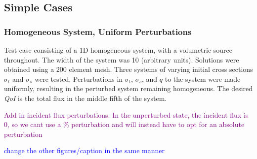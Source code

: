 \documentclass[12pt]{report}
\newcommand{\sigt}{\sigma_t}
\newcommand{\sigs}{\sigma_s}
\newcommand{\scalSource}{q}
\newcommand{\qoi}{{\it QoI}\xspace}
\newcommand{\comment}[2]{\marginpar{\textcolor{#2}{$\star$}}\textcolor{#2}{#1}\newline}
\newcommand{\jcr}[1]{\comment{#1}{blue}}
\newcommand{\todo}[1]{\comment{#1}{purple}}
\newcommand{\jcr}[1]{\phantom{a}}
\newcommand{\todo}[1]{\phantom{a}}
\begin{document}
\subsection{Simple Cases}
\subsubsection{Homogeneous System, Uniform Perturbations}
Test case consisting of a 1D homogeneous system, with a volumetric source throughout. The width of the system was 10 (arbitrary units). Solutions were obtained using a 200 element mesh. Three systems of varying initial cross sections $\sigt$ and $\sigs$ were tested. Perturbations in $\sigt$, $\sigs$, and $\scalSource$ to the system were made uniformly, resulting in the perturbed system remaining homogeneous. The desired \qoi is the total flux in the middle fifth of the system.

\todo{Add in incident flux perturbations. In the unperturbed state, the incident flux is 0, so we cant use a \% perturbation and will instead have to opt for an absolute perturbation}

\jcr{change the other figures/caption in the same manner}
\end{document}
